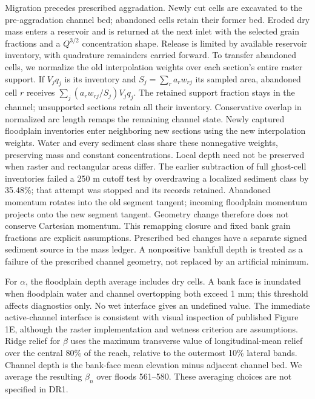Migration precedes prescribed aggradation. Newly cut cells are excavated
to the pre-aggradation channel bed; abandoned cells retain their former
bed. Eroded dry mass enters a reservoir and is returned at the next inlet
with the selected grain fractions and a $Q^{3/2}$ concentration shape.
Release is limited by available reservoir inventory, with quadrature
remainders carried forward. To transfer abandoned cells, we normalize the
old interpolation weights over each section's entire raster support. If
$V_jq_j$ is its inventory and $S_j=\sum_r a_rw_{rj}$ its sampled area,
abandoned cell $r$ receives $\sum_j(a_rw_{rj}/S_j)V_jq_j$. The retained
support fraction stays in the channel; unsupported sections retain all their
inventory. Conservative overlap in normalized arc length remaps the remaining
channel state. Newly captured floodplain inventories enter neighboring new
sections using the new interpolation weights. Water and every sediment class
share these nonnegative weights, preserving mass and constant concentrations.
Local depth need not be preserved when raster and rectangular areas differ.
The earlier subtraction of full ghost-cell inventories failed a 250 m cutoff
test by overdrawing a localized sediment class by 35.48\%; that attempt was
stopped and its records retained.
Abandoned momentum rotates into the old segment tangent; incoming floodplain
momentum projects onto the new segment tangent. Geometry change therefore
does not conserve Cartesian momentum. This remapping closure and fixed bank
grain fractions are explicit assumptions. Prescribed bed
changes have a separate signed sediment source in the mass ledger.
A nonpositive bankfull depth is treated as a failure of the prescribed
channel geometry, not replaced by an artificial minimum.

For $\alpha$, the floodplain depth average includes dry cells. A bank face
is inundated when floodplain water and channel overtopping both exceed
1 mm; this threshold affects diagnostics only. No wet interface gives an
undefined value. The immediate active-channel interface is consistent
with visual inspection of published Figure 1E, although the raster
implementation and wetness criterion are assumptions. Ridge relief for
$\beta$ uses the maximum transverse value of longitudinal-mean relief over
the central 80\% of the reach, relative to the outermost 10\% lateral bands.
Channel depth is the bank-face mean elevation minus adjacent channel bed.
We average the resulting $\beta_n$ over floods 561--580. These averaging
choices are not specified in DR1.
